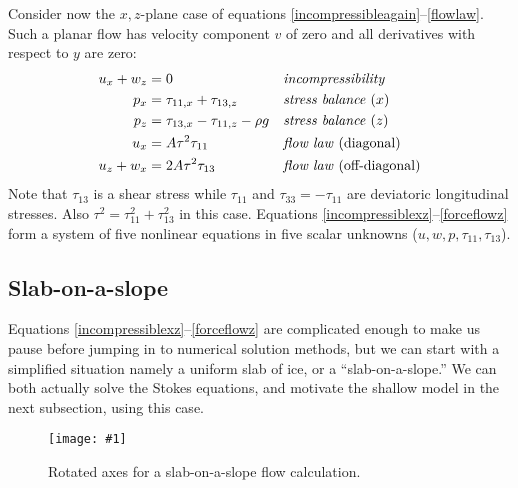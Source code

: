 \documentclass[letterpaper,final,12pt,reqno]{amsart}
\newcommand{\onefigsize}[3]{
\begin{figure}[ht]
\centering
\texttt{[image: \#1]}
\caption{#2}
\label{fig:#1}
\end{figure}}
\newcommand{\onefig}[2]{\onefigsize{#1}{#2}{3.0in}}
\begin{document}
Consider now the $x,z$-plane case of equations \eqref{incompressibleagain}--\eqref{flowlaw}.  Such a planar flow has velocity component $v$ of zero and all derivatives with respect to $y$ are zero:
\begin{align}
u_x + w_z &= 0 &&\text{\emph{incompressibility}} \label{incompressiblexz} \\
p_x &= \tau_{11,x} + \tau_{13,z} &&\text{\emph{stress balance} ($x$)} \label{stokespx} \\
p_z &= \tau_{13,x} - \tau_{11,z} - \rho g &&\text{\emph{stress balance} ($z$)} \label{stokespz} \\
u_x &= A \tau^2 \tau_{11} &&\text{\emph{flow law} (diagonal)}  \label{forceflowx} \\
u_z + w _x &= 2 A \tau^2 \tau_{13} &&\text{\emph{flow law} (off-diagonal)} \label{forceflowz}
\end{align}
Note that $\tau_{13}$ is a shear stress while $\tau_{11}$ and $\tau_{33}=-\tau_{11}$ are deviatoric longitudinal stresses.  Also $\tau^2 = \tau_{11}^2+\tau_{13}^2$ in this case.  Equations \eqref{incompressiblexz}--\eqref{forceflowz} form a system of five nonlinear equations in five scalar unknowns ($u,w,p,\tau_{11},\tau_{13}$).

\subsection*{Slab-on-a-slope}  Equations \eqref{incompressiblexz}--\eqref{forceflowz} are complicated enough to make us pause before jumping in to numerical solution methods, but we can start with a simplified situation namely a uniform slab of ice, or a ``slab-on-a-slope.''  We can both actually solve the Stokes equations, and motivate the shallow model in the next subsection, using this case.

\onefig{slab}{Rotated axes for a slab-on-a-slope flow calculation.}
\end{document}
